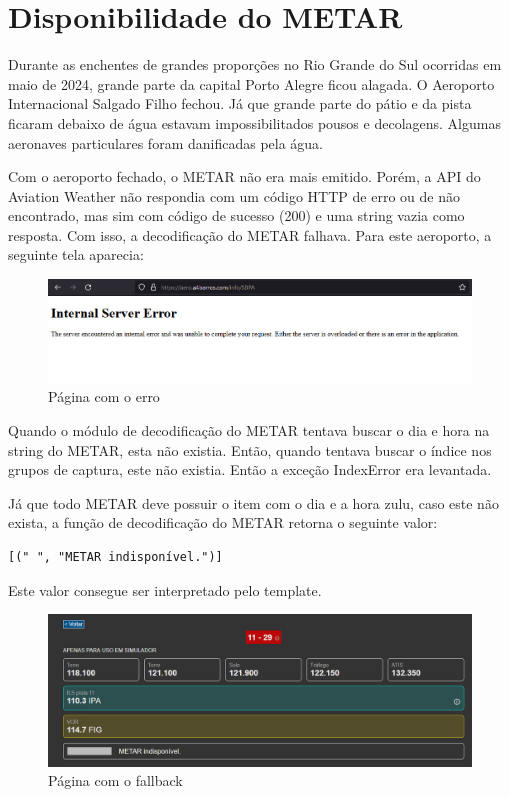 \chapter{Disponibilidade do METAR}

Durante as enchentes de grandes proporções no Rio Grande do Sul ocorridas em maio 
de 2024, grande parte da capital Porto Alegre ficou alagada. O Aeroporto 
Internacional Salgado Filho fechou. Já que grande parte do pátio e da pista 
ficaram debaixo de água estavam impossibilitados pousos e decolagens. Algumas 
aeronaves particulares foram danificadas pela água.

Com o aeroporto fechado, o METAR não era mais emitido. Porém, a API do Aviation 
Weather não respondia com um código HTTP de erro ou de não encontrado, mas sim 
com código de sucesso (200) e uma string vazia como resposta. Com isso, a decodificação
do METAR falhava. Para este aeroporto, a seguinte tela aparecia:

\begin{figure}[ht]
    \begin{center}
    \includegraphics[width=400pt]{img/sbpa-erro.jpeg}
    \caption{Página com o erro}
    \label{fig:sbpa-erro}
    \end{center}
\end{figure}

Quando o módulo de decodificação do METAR tentava buscar o dia e hora na string 
do METAR, esta não existia. Então, quando tentava buscar o índice nos grupos 
de captura, este não existia. Então a exceção IndexError era levantada.

Já que todo METAR deve possuir o item com o dia e a hora zulu, caso este não 
exista, a função de decodificação do METAR retorna o seguinte valor:

\begin{verbatim}
[(" ", "METAR indisponível.")]
\end{verbatim}

Este valor consegue ser interpretado pelo template.

\begin{figure}[ht]
    \begin{center}
    \includegraphics[width=400pt]{img/sbpa.jpeg}
    \caption{Página com o fallback}
    \label{fig:sbpa}
    \end{center}
\end{figure}
